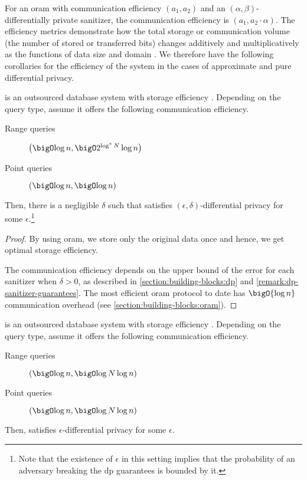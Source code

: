 		For an \acrshort{oram} with communication efficiency $(a_1, a_2)$ and an $(\alpha, \beta)$-differentially private sanitizer, the \epsolute{} communication efficiency is $(a_1, a_2 \cdot \alpha)$.
		The efficiency metrics demonstrate how the total storage or communication volume (the number of stored or transferred bits) changes additively and multiplicatively as the functions of data size \dataSize{} and domain \domainSize{}.
		We therefore have the following corollaries for the efficiency of the system in the cases of approximate and pure differential privacy.
		\begin{corollary}\label{corollary:comm-efficiency-approximate-dp}
			\epsolute{} is an outsourced database system with storage efficiency .
			Depending on the query type, assume it offers the following communication efficiency.
			\begin{description}
				\item[Range queries] $\efficiency{\log \dataSize}{2^{\log^* \domainSize} \log \dataSize}$
				\item[Point queries] $\efficiency{\log \dataSize}{\log \dataSize}$
			\end{description}
			Then, there is a negligible $\delta$ such that \epsolute{} satisfies $(\epsilon, \delta)$\hyp{}differential privacy for some $\epsilon$.\footnote{
				Note that the existence of $\epsilon$ in this setting implies that the probability of an adversary breaking the \acrshort{dp} guarantees is bounded by it.
			}
		\end{corollary}

		\begin{proof}
			By using \acrshort{oram}, we store only the original data once and hence, we get optimal storage efficiency.

			The communication efficiency depends on the upper bound of the error for each sanitizer when $\delta > 0$, as described in \cref{section:building-blocks:dp} and \cref{remark:dp-sanitizer-guarantees}.
			The most efficient \acrshort{oram} protocol to date has $\bigO{\log \dataSize}$ communication overhead (see \cref{section:building-blocks:oram}).
		\end{proof}

		\begin{corollary}\label{corollary:comm-efficiency-pure-dp}
			\epsolute{} is an outsourced database system with storage efficiency .
			Depending on the query type, assume it offers the following communication efficiency.
			\begin{description}
				\item[Range queries] $\efficiency{\log \dataSize}{\log \domainSize \log \dataSize}$
				\item[Point queries] $\efficiency{\log \dataSize}{\log \domainSize \log \dataSize}$
			\end{description}
			Then, \epsolute{} satisfies $\epsilon$-differential privacy for some $\epsilon$.
		\end{corollary}

